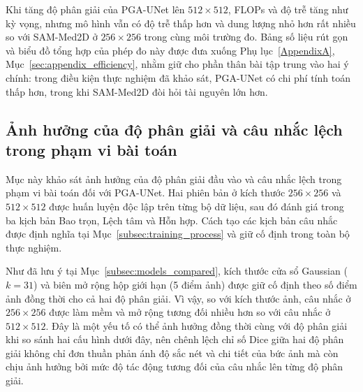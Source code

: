 Khi tăng độ phân giải của PGA-UNet lên $512\times512$, FLOPs và độ trễ tăng như kỳ vọng, nhưng mô hình vẫn có độ trễ thấp hơn và dung lượng nhỏ hơn rất nhiều so với SAM-Med2D ở $256\times256$ trong cùng môi trường đo. Bảng số liệu rút gọn và biểu đồ tổng hợp của phép đo này được đưa xuống Phụ lục~\ref{AppendixA}, Mục~\ref{sec:appendix_efficiency}, nhằm giữ cho phần thân bài tập trung vào hai ý chính: trong điều kiện thực nghiệm đã khảo sát, PGA-UNet có chi phí tính toán thấp hơn, trong khi SAM-Med2D đòi hỏi tài nguyên lớn hơn.
\subsection{Ảnh hưởng của độ phân giải và câu nhắc lệch trong phạm vi bài toán}
\label{subsec:resolution_prompt}

Mục này khảo sát ảnh hưởng của độ phân giải đầu vào và câu nhắc lệch trong phạm vi bài toán đối với PGA-UNet. Hai phiên bản ở kích thước $256\times256$ và $512\times512$ được huấn luyện độc lập trên từng bộ dữ liệu, sau đó đánh giá trong ba kịch bản Bao trọn, Lệch tâm và Hỗn hợp. Cách tạo các kịch bản câu nhắc được định nghĩa tại Mục~\ref{subsec:training_process} và giữ cố định trong toàn bộ thực nghiệm.

Như đã lưu ý tại Mục~\ref{subsec:models_compared}, kích thước cửa sổ Gaussian ($k=31$) và biên mở rộng hộp giới hạn (5 điểm ảnh) được giữ cố định theo số điểm ảnh đồng thời cho cả hai độ phân giải. Vì vậy, so với kích thước ảnh, câu nhắc ở $256\times256$ được làm mềm và mở rộng tương đối nhiều hơn so với câu nhắc ở $512\times512$. Đây là một yếu tố có thể ảnh hưởng đồng thời cùng với độ phân giải khi so sánh hai cấu hình dưới đây, nên chênh lệch chỉ số Dice giữa hai độ phân giải không chỉ đơn thuần phản ánh độ sắc nét và chi tiết của bức ảnh mà còn chịu ảnh hưởng bởi mức độ tác động tương đối của câu nhắc lên từng độ phân giải.

